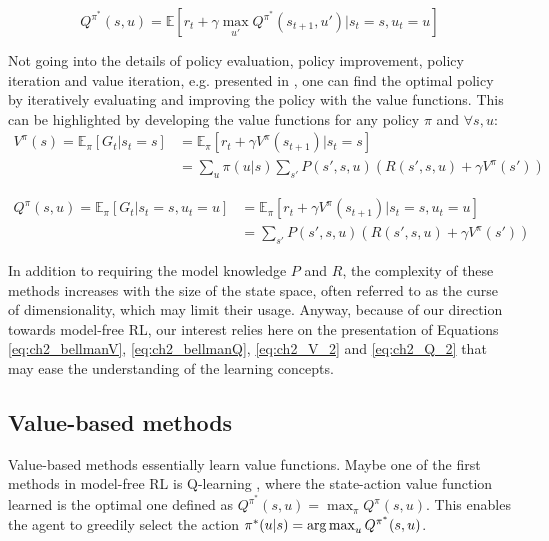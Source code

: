 \begin{equation}
\label{eq:ch2_bellmanQ}
    Q^{\pi^*}(s, u) = \mathbb{E}[r_t + \gamma \max_{u'} Q^{\pi^*}(s_{t+1}, u') |s_t=s, u_t=u]
\end{equation}

Not going into the details of policy evaluation, policy improvement, policy iteration and value iteration, e.g. presented in \citep{sutton2018reinforcement}, one can find the optimal policy by iteratively evaluating and improving the policy with the value functions.
This can be highlighted by developing the value functions for any policy $\pi$ and $\forall s, u$:
\begin{equation}
\label{eq:ch2_V_2}
\begin{split}
    V^\pi(s)= \mathbb{E}_{\pi}\left[G_t|s_t=s\right] & = \mathbb{E}_{\pi}\left[r_t + \gamma V^\pi(s_{t+1})|s_t=s\right]\\
     & = \sum_{u} \pi(u|s) \sum_{s'} P(s', s, u) (R(s', s, u) + \gamma V^\pi(s'))
\end{split}
\end{equation}

\begin{equation}
\label{eq:ch2_Q_2}
\begin{split}
    Q^\pi(s, u) = \mathbb{E}_{\pi}\left[G_t|s_t=s, u_t=u\right] & = \mathbb{E}_{\pi}\left[r_t + \gamma V^\pi(s_{t+1})|s_t=s, u_t=u \right] \\
    &  = \sum_{s'} P(s', s, u) (R(s', s, u) + \gamma V^\pi(s'))
\end{split}
\end{equation}

In addition to requiring the model knowledge $P$ and $R$, the complexity of these methods increases with the size of the state space, often referred to as the curse of dimensionality, which may limit their usage.
Anyway, because of our direction towards model-free RL, our interest relies here on the presentation of Equations \ref{eq:ch2_bellmanV}, \ref{eq:ch2_bellmanQ}, \ref{eq:ch2_V_2} and \ref{eq:ch2_Q_2} that may ease the understanding of the learning concepts.


\subsection{Value-based methods} \label{sec:ch2_value_based_methods}
Value-based methods essentially learn value functions.
Maybe one of the first methods in model-free RL is Q-learning \citep{watkins1992q}, where the state-action value function learned is the optimal one defined as $Q^{\pi^*}(s, u)=\max_{\pi}Q^\pi(s, u)$.
This enables the agent to greedily select the action $\pi^*(u|s)=\operatorname*{arg\,max}_u Q^{\pi^*}(s, u)$.

